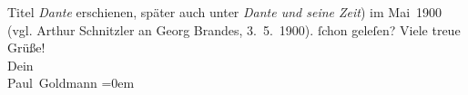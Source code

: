 \begin{ledgroupsized}[t]{13cm}
{{{                  Titel \emph{Dante} erschienen, später auch unter \emph{Dante und seine Zeit}) im Mai 1900 (vgl. Arthur Schnitzler an Georg Brandes, 3. 5. 1900).}}}\label{K_L02908-4h} ſchon geleſen?\pend
           \pstart
           Viele treue Grüße! {\\[\baselineskip]}Dein {\\[\baselineskip]}\spacefill\mbox{Paul Goldmann}\pend
           \leftskip=0em{}
         
         \endnumbering{}\end{ledgroupsized}  \newcommand{\dateiname}{L02908}\newcommand{\titel}{Paul Goldmann an Arthur Schnitzler, 24. 3. [1900]}\newcommand{\editorInnen}{Martin Anton Müller und Laura Untner}
      